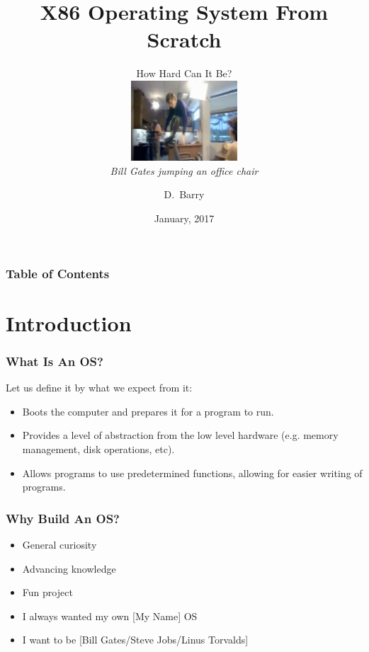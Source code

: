 \documentclass[10pt]{beamer}
\title{X86 Operating System From Scratch}
\subtitle{
  How Hard Can It Be?
  \vspace{0.5cm}
  \\
  \includegraphics[height=3cm,keepaspectratio]{chair-jump.jpg}
  \\
  \scriptsize{\emph{Bill Gates jumping an office chair}}
}
\author[UH CSS]{D.~Barry\inst{1}}
\institute{
  \inst{1}
  Computer Science Society
  \\
  University of Hertforshire
}
\date{January, 2017}
\begin{document}
  \frame{\titlepage}
  \begin{frame}
    \frametitle{Table of Contents}
    \begin{block}{}
      \vspace{0.5cm}
      \tableofcontents
      \vspace{0.5cm}
    \end{block}
  \end{frame}
  \section[Intro]{Introduction}
  \begin{frame}
    \frametitle{What Is An OS?}
    Let us define it by what we expect from it:
    \begin{itemize}
      \item Boots the computer and prepares it for a program to run.
      \item Provides a level of abstraction from the low level hardware (e.g.
        memory management, disk operations, etc).
      \item Allows programs to use predetermined functions, allowing for easier
        writing of programs.
    \end{itemize}
  \end{frame}
  \begin{frame}
    \frametitle{Why Build An OS?}
    \begin{itemize}
      \item General curiosity
      \item Advancing knowledge
      \item Fun project
      \item I always wanted my own [My Name] OS
      \item I want to be [Bill Gates/Steve Jobs/Linus Torvalds]
    \end{itemize}
  \end{frame}
\end{document}
